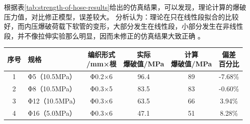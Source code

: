 \begin{figure}[!htp]
	\centering
	\hspace{0.5cm}
	\label{fig:stress}
\end{figure}


根据表\ref{tab:strength-of-hose-results}给出的仿真结果，可以发现，\ha 理论计算的爆破压力值，对比修正模型，误差较大。
分析认为：\ha 理论在只在线性段拟合的比较好，而内压爆破荷载下软管的变形，大部分发生在线性段，小部分发生在非线性段，并不像拉伸实验那么明显，因而\ha 未修正的仿真结果大致正确 。








\begin{table}[!htb]
	\centering
	\label{tab:strength-of-hose}
	\begin{tabular}{@{\extracolsep{\fill}}>{\hspace{0.5cm}}clcccc}
		\toprule
		序号 &    规格     & \tabincell{c}{编织形式\\/mm×根 }& \tabincell{c}{实际\\爆破值/MPa }& \tabincell{c}{计算\\爆破值/MPa}& \tabincell{c}{偏差\\百分比}  \\ \midrule
		1  & Φ5（10.5MPa）  & Φ0.2×6  &   96.4    & 89          & -7.68\% \\
		2  & Φ8（10.5MPa）  & Φ0.3×5  &   83.5    & 83          & -0.60\% \\
		3  & Φ12（10.5MPa） & Φ0.3×6  &   63.5    & 66          & 3.94\%  \\
		4  & Φ16（5.0MPa）  & Φ0.3×6  &   47.1    & 51          & 8.28\% \\ \bottomrule
	\end{tabular} 
	\end{table}  

